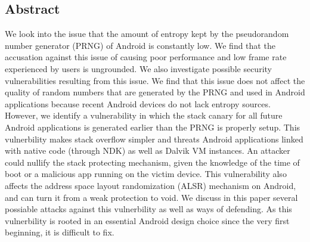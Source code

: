 \subsection*{Abstract}
We look into the issue that the amount of entropy kept by the pseudorandom number generator (PRNG) of Android is constantly low. We find that the accusation against this issue of causing poor performance and low frame rate experienced by users is ungrounded. We also investigate possible security vulnerabilities resulting from this issue. We find that this issue does not affect the quality of random numbers that are generated by the PRNG and used in Android applications because recent Android devices do not lack entropy sources. However, we identify a vulnerability in which the stack canary for all future Android applications is generated earlier than the PRNG is properly setup. This vulnerbility makes stack overflow simpler and threats Android applications linked with native code (through NDK) as well as Dalvik VM instances. An attacker could nullify the stack protecting mechanism, given the knowledge of the time of boot or a malicious app running on the victim device. This vulnerability also affects the address space layout randomization (ALSR) mechanism on Android, and can turn it from a weak protection to void. We discuss in this paper several possiable attacks against this vulnerbility as well as ways of defending. As this vulnerbility is rooted in an essential Android design choice since the very first beginning, it is difficult to fix.

